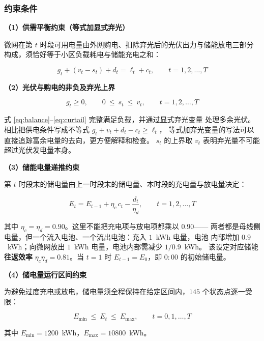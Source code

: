 \documentclass[withoutpreface,bwprint]{cumcmthesis}
\begin{document}
\subsubsection{约束条件}

\textbf{（1）供需平衡约束（等式加显式弃光）}

微网在第 $t$ 时段可用电量由外网购电、扣除弃光后的光伏出力与储能放电三部分
构成，须恰好等于小区负载耗电与储能充电之和：

\begin{equation}
  g_t + (v_t - s_t) + d_t = \ell_t + c_t, \qquad t = 1,2,\dots,T
  \label{eq:balance}
\end{equation}

\textbf{（2）光伏与购电的非负及弃光上界}

\begin{equation}
  g_t \ge 0, \qquad 0 \ \le\ s_t \ \le\ v_t, \qquad t = 1,2,\dots,T
  \label{eq:curtail}
\end{equation}

式 \eqref{eq:balance}--\eqref{eq:curtail} 完整满足负载，并通过显式弃光变量
处理多余光伏。相比把供电条件写成不等式 $g_t+v_t+d_t-c_t \ge \ell_t$，
等式加弃光变量的写法可以直接追踪富余电量的去向，更方便解释和检查。
$s_t$ 的上界取 $v_t$ 表明弃光量不可能超过光伏发电量本身。

\textbf{（3）储能电量递推约束}

第 $t$ 时段末的储电量由上一时段末的储电量、本时段的充电量与放电量决定：

\begin{equation}
  E_t = E_{t-1} + \eta_c\, c_t - \frac{d_t}{\eta_d},
  \qquad t = 1,2,\dots,T
  \label{eq:recursion}
\end{equation}

其中 $\eta_c = \eta_d = 0.90$。这里不能把充电项与放电项都乘以 $0.90$——
两者都是母线侧电量，但一个流入电池、一个流出电池：充入 $1$~kWh 电量，电池
内部增加 $0.9$~kWh；向微网放出 $1$~kWh 电量，电池内部需减少 $1/0.9$~kWh。
该设定对应储能\textbf{往返效率} $\eta_c\eta_d = 0.81$。当 $t = 1$ 时
$E_{t-1} = E_0$，即 $0{:}00$ 的初始储电量。

\textbf{（4）储电量运行区间约束}

为避免过度充电或放电，储电量须全程保持在给定区间内，$145$ 个状态点逐一受限：

\begin{equation}
  E_{\min} \ \le\ E_t \ \le\ E_{\max}, \qquad t = 0,1,\dots,T
  \label{eq:socbound}
\end{equation}

其中 $E_{\min} = 1200$~kWh，$E_{\max} = 10800$~kWh。
\end{document}
